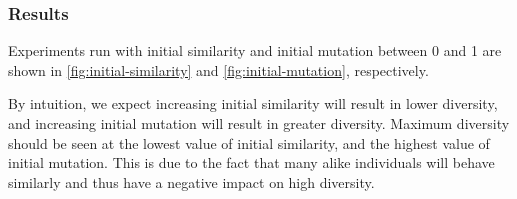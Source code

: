 \subsubsection{Results}
Experiments run with initial similarity and initial mutation between 0 and 1 are shown in \cref{fig:initial-similarity} and \cref{fig:initial-mutation}, respectively.

By intuition, we expect increasing initial similarity will result in lower diversity, and increasing initial mutation will result in greater diversity. Maximum diversity should be seen at the lowest value of initial similarity, and the highest value of initial mutation. This is due to the fact that many alike individuals will behave similarly and thus have a negative impact on high diversity.








